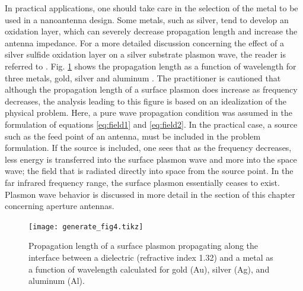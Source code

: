 \documentclass[11pt]{article}
\begin{document}
In practical applications, one should take care in the selection of the metal to be used in a nanoantenna design. Some metals, such as silver, tend to develop an oxidation layer, which can severely decrease propagation length and increase the antenna impedance. For a more detailed discussion concerning the effect of a silver sulfide oxidation layer on a silver substrate plasmon wave, the reader is referred to \cite{Nevels2014}.
%
Fig. \ref{fig:plength} shows the propagation length as a function of wavelength for three metals, gold, silver and aluminum \cite{9783540339199}. The practitioner is cautioned that although the propagation length of a surface plasmon does increase as frequency decreases, the analysis leading to this figure is based on an idealization of the physical problem. Here, a pure wave propagation condition was assumed in the formulation of equations \eqref{eq:field1} and \eqref{eq:field2}. In the practical case, a source such as the feed point of an antenna, must be included in the problem formulation. If the source is included, one sees that as the frequency decreases, less energy is transferred into the surface plasmon wave and more into the space wave; the field that is radiated directly into space from the source point. In the far infrared frequency range, the surface plasmon essentially ceases to exist. Plasmon wave behavior is discussed in more detail in the section of this chapter concerning aperture antennas.
%
\begin{figure}[t!]
  \centering
  {\texttt{[image: generate\_fig4.tikz]}}
  \caption{Propagation length of a surface plasmon propagating along the interface between a dielectric (refractive index 1.32) and a metal as a function of wavelength calculated for gold (Au), silver (Ag), and aluminum (Al).}
  \label{fig:plength}
\end{figure}
%
\end{document}
